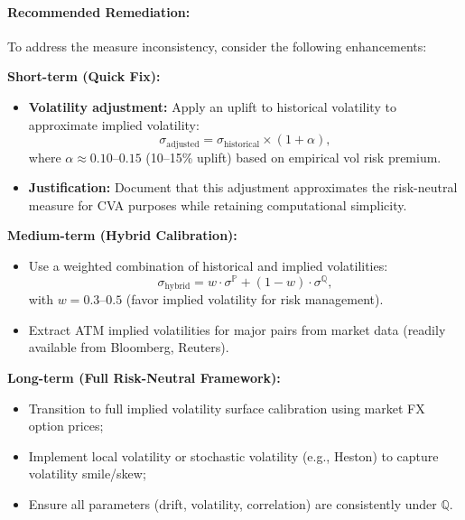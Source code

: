 \paragraph{Recommended Remediation:}

To address the measure inconsistency, consider the following enhancements:

\textbf{Short-term (Quick Fix):}
\begin{itemize}
	\item \textbf{Volatility adjustment:} Apply an uplift to historical volatility to approximate implied volatility:
	\begin{equation}
		\sigma_{\text{adjusted}} = \sigma_{\text{historical}} \times (1 + \alpha),
	\end{equation}
	where $\alpha \approx 0.10$--$0.15$ (10--15\% uplift) based on empirical vol risk premium.
	
	\item \textbf{Justification:} Document that this adjustment approximates the risk-neutral measure for CVA purposes while retaining computational simplicity.
\end{itemize}

\textbf{Medium-term (Hybrid Calibration):}
\begin{itemize}
	\item Use a weighted combination of historical and implied volatilities:
	\begin{equation}
		\sigma_{\text{hybrid}} = w \cdot \sigma^{\mathbb{P}} + (1-w) \cdot \sigma^{\mathbb{Q}},
	\end{equation}
	with $w = 0.3$--$0.5$ (favor implied volatility for risk management).
	
	\item Extract ATM implied volatilities for major pairs from market data (readily available from Bloomberg, Reuters).
\end{itemize}

\textbf{Long-term (Full Risk-Neutral Framework):}
\begin{itemize}
	\item Transition to full implied volatility surface calibration using market FX option prices;
	\item Implement local volatility or stochastic volatility (e.g., Heston) to capture volatility smile/skew;
	\item Ensure all parameters (drift, volatility, correlation) are consistently under $\mathbb{Q}$.
\end{itemize}

